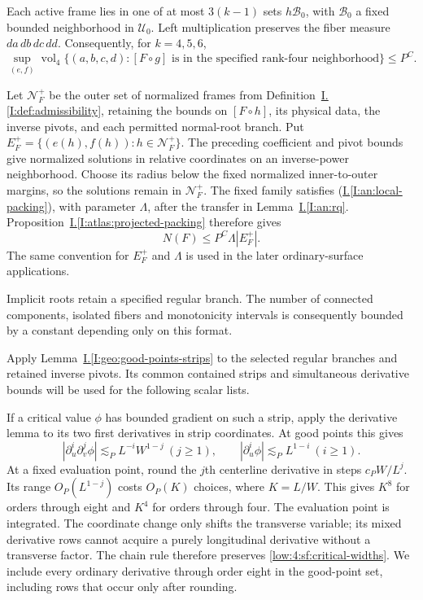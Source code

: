 \documentclass[11pt]{amsart}
\makeatletter
\theoremstyle{definition}
\theoremstyle{remark}
\DeclareMathOperator{\vol}{vol}
\numberwithin{equation}{section}
\newcommand{\equationalias}[1]{\begingroup\protected@edef\@currentlabel{\p@equation\theequation}\protected@edef\@currentHref{equation.\theHequation}\label{#1}\endgroup}
\newcommand{\partIref}[1]{\hyperref[I:#1]{I.\ref*{I:#1}}}
\newcommand{\partIeqref}[1]{\textup{(\partIref{#1})}}
\makeatother
\begin{document}
Each active frame lies in one of at most $3(k-1)$ sets $h\mathcal B_0$, with $\mathcal B_0$ a fixed bounded neighborhood in $\mathcal U_0$. Left multiplication preserves the fiber measure $da\,db\,dc\,dd$. Consequently, for $k=4,5,6$,
\begin{equation}\label{low:4:sf:eq:fibervol}
\sup_{(e,f)}\vol_4\{(a,b,c,d):[F\circ g]\text{ is in the specified rank-four neighborhood}\}\le P^C.
\end{equation}
\equationalias{low:5:qsf:eq:fibervol}\equationalias{low:6:qsf:eq:fibervol}

Let $\mathcal N_F^+$ be the outer set of normalized frames from Definition~\partIref{def:admissibility}, retaining the bounds on $[F\circ h]$, its physical data, the inverse pivots, and each permitted normal-root branch. Put $E_F^+=\{(e(h),f(h)):h\in\mathcal N_F^+\}$. The preceding coefficient and pivot bounds give normalized solutions in relative coordinates on an inverse-power neighborhood. Choose its radius below the fixed normalized inner-to-outer margins, so the solutions remain in $\mathcal N_F^+$. The fixed family satisfies \partIeqref{an:local-packing}, with parameter $\Lambda$, after the transfer in Lemma~\partIref{an:rq}. Proposition~\partIref{atlas:projected-packing} therefore gives
\begin{equation}\label{low:4:sf:eq:area}
N(F)\le P^C\Lambda|E_F^+|.
\end{equation}
The same convention for $E_F^+$ and $\Lambda$ is used in the later ordinary-surface applications.

Implicit roots retain a specified regular branch. The number of connected components, isolated fibers and monotonicity intervals is consequently bounded by a constant depending only on this format.

Apply Lemma~\partIref{geo:good-points-strips} to the selected regular branches and retained inverse pivots. Its common contained strips and simultaneous derivative bounds will be used for the following scalar lists.

If a critical value $\phi$ has bounded gradient on such a strip, apply the derivative lemma to its two first derivatives in strip coordinates. At good points this gives
\begin{equation}\label{low:4:sf:critical-widths}
 |\partial_u^i\partial_v^j\phi|\lesssim_P L^{-i}W^{1-j}\ (j\ge1),\qquad |\partial_u^i\phi|\lesssim_P L^{1-i}\ (i\ge1).
\end{equation}
\equationalias{low:5:qsf:critical-widths}\equationalias{low:6:qsf:critical-widths}
At a fixed evaluation point, round the $j$th centerline derivative in steps $c_PW/L^j$. Its range $O_P(L^{1-j})$ costs $O_P(K)$ choices, where $K=L/W$. This gives $K^8$ for orders through eight and $K^4$ for orders through four. The evaluation point is integrated. The coordinate change only shifts the transverse variable; its mixed derivative rows cannot acquire a purely longitudinal derivative without a transverse factor. The chain rule therefore preserves \eqref{low:4:sf:critical-widths}. We include every ordinary derivative through order eight in the good-point set, including rows that occur only after rounding.
\end{document}
